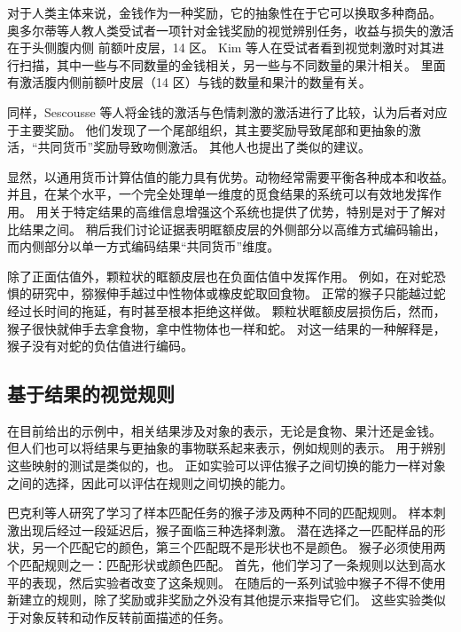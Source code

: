 对于人类主体来说，金钱作为一种奖励，它的抽象性在于它可以换取多种商品。
奥多尔蒂等人\cite{o2001abstract}教人类受试者一项针对金钱奖励的视觉辨别任务，收益与损失的激活在于头侧腹内侧 前额叶皮层，14 区。
Kim 等人\cite{kim2011overlapping}在受试者看到视觉刺激时对其进行扫描，其中一些与不同数量的金钱相关，另一些与不同数量的果汁相关。
里面有激活腹内侧前额叶皮层（14 区）与钱的数量和果汁的数量有关。\par


同样，Sescousse 等人\cite{sescousse2010architecture}将金钱的激活与色情刺激的激活进行了比较，认为后者对应于主要奖励。
他们发现了一个尾部组织，其主要奖励导致尾部和更抽象的激活，“共同货币”奖励导致吻侧激活。
其他人也提出了类似的建议\cite{kringelbach2004functional}。\par


显然，以通用货币计算估值的能力具有优势。动物经常需要平衡各种成本和收益。
并且，在某个水平，一个完全处理单一维度的觅食结果的系统可以有效地发挥作用。
用关于特定结果的高维信息增强这个系统也提供了优势，特别是对于了解对比结果之间。
稍后我们讨论证据表明眶额皮层的外侧部分以高维方式编码输出，而内侧部分以单一方式编码结果“共同货币”维度。\par


除了正面估值外，颗粒状的眶额皮层也在负面估值中发挥作用。
例如，在对蛇恐惧的研究中，猕猴伸手越过中性物体或橡皮蛇取回食物。
正常的猴子只能越过蛇经过长时间的拖延，有时甚至根本拒绝这样做。
颗粒状眶额皮层损伤后，然而，猴子很快就伸手去拿食物，拿中性物体也一样和蛇\cite{izquierdo2005comparison}。
对这一结果的一种解释是，猴子没有对蛇的负估值进行编码。
\par



\subsection{基于结果的视觉规则}

在目前给出的示例中，相关结果涉及对象的表示，无论是食物、果汁还是金钱。
但人们也可以将结果与更抽象的事物联系起来表示，例如规则的表示。
用于辨别这些映射的测试是类似的，也。
正如实验可以评估猴子之间切换的能力一样对象之间的选择，因此可以评估在规则之间切换的能力。\par


巴克利等人\cite{buckley2009dissociable}研究了学习了样本匹配任务的猴子涉及两种不同的匹配规则。
样本刺激出现后经过一段延迟后，猴子面临三种选择刺激。
潜在选择之一匹配样品的形状，另一个匹配它的颜色，第三个匹配既不是形状也不是颜色。
猴子必须使用两个匹配规则之一：匹配形状或颜色匹配。
首先，他们学习了一条规则以达到高水平的表现，然后实验者改变了这条规则。
在随后的一系列试验中猴子不得不使用新建立的规则，除了奖励或非奖励之外没有其他提示来指导它们。
这些实验类似于对象反转和动作反转前面描述的任务。\par


